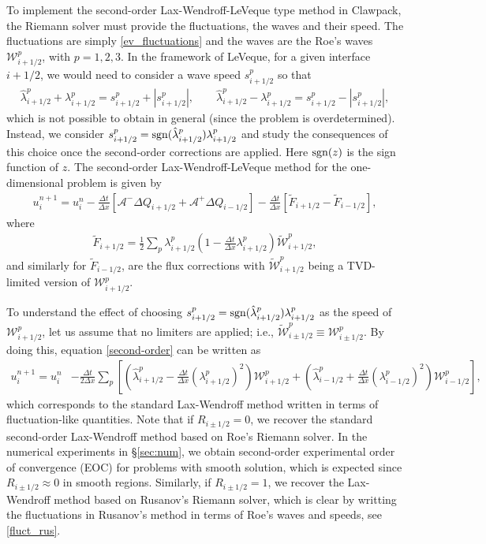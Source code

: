 \documentclass[preprint, 11pt]{article}
\newcommand{\W}{{\mathcal W}}
\newcommand{\A}{{\mathcal A}}
\newcommand{\sgn}{{\rm sgn}}
\begin{document}
To implement the second-order Lax-Wendroff-LeVeque type method in Clawpack, the Riemann solver must provide 
the fluctuations, the waves and their speed. The fluctuations are simply \eqref{ev_fluctuations} 
and the waves are the Roe's waves $\W_{i+1/2}^p$, with $p=1,2,3$. 
In the framework of LeVeque, for a given interface $i+1/2$, 
we would need to consider a wave speed $s_{i+1/2}^p$ so that 
\begin{align*}
  \hat \lambda_{i+1/2}^p+\lambda_{i+1/2}^p = s_{i+1/2}^p+|s_{i+1/2}^p|, \qquad 
  \hat \lambda_{i+1/2}^p-\lambda_{i+1/2}^p = s_{i+1/2}^p-|s_{i+1/2}^p|,
\end{align*}
which is not possible to obtain in general (since the problem is overdetermined). 
Instead, we consider 
$s_{i+1/2}^p=\sgn(\hat\lambda_{i+1/2}^p)\lambda_{i+1/2}^p$ 
 and study the consequences of this choice once the second-order corrections are applied.
Here $\sgn(z)$ is the sign function of $z$. 
The second-order Lax-Wendroff-LeVeque method for the one-dimensional problem is given by 
\begin{align}\label{second-order}
  u_i^{n+1}=u_i^n
  -\frac{\Delta t}{\Delta x}\left[\A^-\Delta Q_{i+1/2}+\A^+\Delta Q_{i-1/2}\right]
  -\frac{\Delta t}{\Delta x}\left[\tilde F_{i+1/2}-\tilde F_{i-1/2}\right],
\end{align}
where 
\begin{align*}
  \tilde F_{i+1/2} = \frac{1}{2}\sum_p\lambda_{i+1/2}^p
  \left(1-\frac{\Delta t}{\Delta x}\lambda_{i+1/2}^p\right)\tilde\W_{i+1/2}^p,
\end{align*}
and similarly for $\tilde F_{i-1/2}$, are the flux corrections with $\tilde\W_{i+1/2}^p$ 
being a TVD-limited version of $\W_{i+1/2}^p$. 

To understand the effect of choosing $s_{i+1/2}^p=\sgn(\hat\lambda_{i+1/2}^p)\lambda_{i+1/2}^p$ 
as the speed of $\W_{i+1/2}^p$, 
let us assume that no limiters are applied; i.e., $\tilde\W_{i\pm 1/2}^p\equiv \W_{i\pm 1/2}^p$.
By doing this, equation \eqref{second-order} can be written as 
\begin{align*}
  u_i^{n+1}=u_i^n
  &-\frac{\Delta t}{2 \Delta x}
  \sum_p
  \left[\left(\hat\lambda_{i+1/2}^p -\frac{\Delta t}{\Delta x}(\lambda_{i+1/2}^p)^2 \right)\W_{i+1/2}^p
  +
  \left(\hat\lambda_{i-1/2}^p +\frac{\Delta t}{\Delta x}(\lambda_{i-1/2}^p)^2 \right)\W_{i-1/2}^p\right],
\end{align*}
which corresponds to the standard Lax-Wendroff method written in terms of fluctuation-like quantities. 
Note that if $R_{i\pm 1/2}=0$, we recover the standard second-order Lax-Wendroff method based on 
Roe's Riemann solver. 
In the numerical experiments in \S\ref{sec:num}, we obtain second-order experimental 
order of convergence (EOC) for problems with smooth solution, which is expected since 
$R_{i\pm 1/2}\approx 0$ in smooth regions.
Similarly, if $R_{i\pm 1/2}=1$, we recover the Lax-Wendroff method based on Rusanov's Riemann solver, 
which is clear by writting the fluctuations in Rusanov's method in terms of Roe's waves and speeds, 
see \eqref{fluct_rus}.
\end{document}
